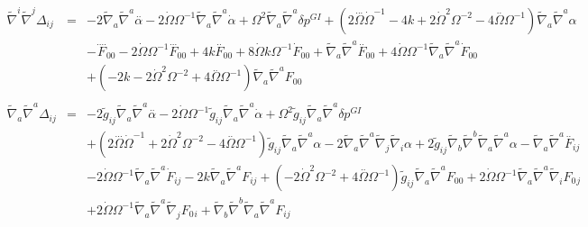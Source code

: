 \documentclass[10pt,letterpaper]{article}
\numberwithin{equation}{section}
\begin{document}
\begin{appendices}
\begin{eqnarray}
\\  \nonumber\\ 
\tilde\nabla^i\tilde\nabla^j\Delta_{ij}&=& -2 \tilde{\nabla}_{a}\tilde{\nabla}^{a}\overset{..}{\alpha} - 2 \dot{\Omega} \Omega^{-1} \tilde{\nabla}_{a}\tilde{\nabla}^{a}\dot{\alpha} + \Omega^2 \tilde{\nabla}_{a}\tilde{\nabla}^{a}\delta p^{GI}{} + (2 \overset{...}{\Omega} \dot{\Omega}^{-1} - 4 k + 2 \dot{\Omega}^2 \Omega^{-2} - 4 \overset{..}{\Omega} \Omega^{-1}) \tilde{\nabla}_{a}\tilde{\nabla}^{a}\alpha \nonumber \\ 
&& - \overset{....}{F}_{00}{} - 2 \dot{\Omega} \Omega^{-1} \overset{...}{F}_{00}{} + 4 k \overset{..}{F}_{00}{} + 8 \dot{\Omega} k \Omega^{-1} \dot{F}_{00}{} + \tilde{\nabla}_{a}\tilde{\nabla}^{a}\overset{..}{F}_{00}{} + 4 \dot{\Omega} \Omega^{-1} \tilde{\nabla}_{a}\tilde{\nabla}^{a}\dot{F}_{00}{} \nonumber \\ 
&& + (-2 k - 2 \dot{\Omega}^2 \Omega^{-2} + 4 \overset{..}{\Omega} \Omega^{-1}) \tilde{\nabla}_{a}\tilde{\nabla}^{a}F_{00}{}
\\  \nonumber\\ 
\tilde\nabla_a\tilde\nabla^a \Delta_{ij}&=& -2 \tilde{g}_{ij} \tilde{\nabla}_{a}\tilde{\nabla}^{a}\overset{..}{\alpha} - 2 \dot{\Omega} \Omega^{-1} \tilde{g}_{ij} \tilde{\nabla}_{a}\tilde{\nabla}^{a}\dot{\alpha} + \Omega^2 \tilde{g}_{ij} \tilde{\nabla}_{a}\tilde{\nabla}^{a}\delta p^{GI}{} \nonumber \\ 
&& + (2 \overset{...}{\Omega} \dot{\Omega}^{-1} + 2 \dot{\Omega}^2 \Omega^{-2} - 4 \overset{..}{\Omega} \Omega^{-1}) \tilde{g}_{ij} \tilde{\nabla}_{a}\tilde{\nabla}^{a}\alpha - 2 \tilde{\nabla}_{a}\tilde{\nabla}^{a}\tilde{\nabla}_{j}\tilde{\nabla}_{i}\alpha + 2 \tilde{g}_{ij} \tilde{\nabla}_{b}\tilde{\nabla}^{b}\tilde{\nabla}_{a}\tilde{\nabla}^{a}\alpha - \tilde{\nabla}_{a}\tilde{\nabla}^{a}\overset{..}{F}_{ij} \nonumber \\ 
&& - 2 \dot{\Omega} \Omega^{-1} \tilde{\nabla}_{a}\tilde{\nabla}^{a}\dot{F}_{ij} - 2 k \tilde{\nabla}_{a}\tilde{\nabla}^{a}F_{ij} + (-2 \dot{\Omega}^2 \Omega^{-2} + 4 \overset{..}{\Omega} \Omega^{-1}) \tilde{g}_{ij} \tilde{\nabla}_{a}\tilde{\nabla}^{a}F_{00}{} + 2 \dot{\Omega} \Omega^{-1} \tilde{\nabla}_{a}\tilde{\nabla}^{a}\tilde{\nabla}_{i}F_{0}{}_{j} \nonumber \\ 
&& + 2 \dot{\Omega} \Omega^{-1} \tilde{\nabla}_{a}\tilde{\nabla}^{a}\tilde{\nabla}_{j}F_{0}{}_{i} + \tilde{\nabla}_{b}\tilde{\nabla}^{b}\tilde{\nabla}_{a}\tilde{\nabla}^{a}F_{ij}
\\  \nonumber\\ 

\end{eqnarray}
\end{appendices}
\end{document}
